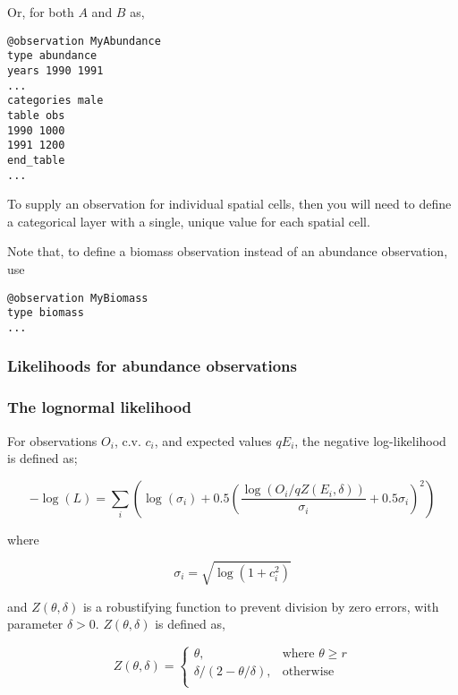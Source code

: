 {{{{Or, for both $A$ and $B$ as,

{\small{\begin{verbatim}
@observation MyAbundance
type abundance
years 1990 1991
...
categories male
table obs
1990 1000
1991 1200
end_table
...
\end{verbatim}}}

To supply an observation for individual spatial cells, then you will need to define a categorical layer with a single, unique value for each spatial cell. 

Note that, to define a biomass observation instead of an abundance observation, use 

{\small{\begin{verbatim}
@observation MyBiomass
type biomass
...
\end{verbatim}}}

\subsubsection{Likelihoods for abundance observations}

\subsubsection*{The lognormal likelihood}

For observations $O_i$, c.v. $c_i$, and expected values $qE_i$, the negative log-likelihood is defined as;

\begin{equation}
 - \log \left(L \right) = \sum\limits_i \left( \log \left( \sigma _i \right) + 0.5\left( \frac{\log \left(O_i / q Z \left(E_i,\delta \right) \right)}{\sigma_i} + 0.5 \sigma_i \right)^2 \right)
\end{equation}

where 

\begin{equation}
  \sigma_i  = \sqrt{\log \left(1+c_i^2 \right)}
\end{equation}

and $Z \left(\theta,\delta \right)$ is a robustifying function to prevent division by zero errors, with parameter $\delta>0$. $Z \left(\theta,\delta \right)$ is defined as,

\begin{equation}
   Z \left(\theta,\delta \right) = \begin{cases}
	  \theta, & \text{where $\theta \ge r$} \\
	  \delta/\left( 2-\theta/\delta \right), & \text{otherwise} \\  
  \end{cases}
\end{equation}

}}}}
